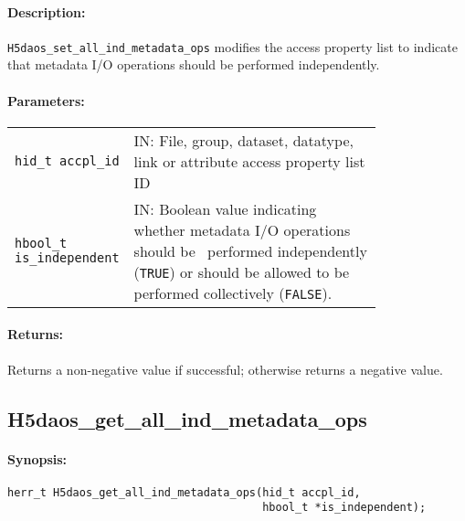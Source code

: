 \documentclass[../users_guide.tex]{subfiles}
\begin{document}
\paragraph{Description:}
\begin{flushleft}%
\texttt{H5daos\_set\_all\_ind\_metadata\_ops} modifies the access property list to indicate
that metadata I/O operations should be performed independently.
\end{flushleft}%

\paragraph{Parameters:}
\begin{flushleft}%
 \begin{tabular}{lp{0.8\linewidth}}%
   \texttt{hid\_t accpl\_id} & IN: File, group, dataset, datatype, link or attribute access property list ID \\
   \texttt{hbool\_t is\_independent} & IN: Boolean value indicating whether metadata I/O operations should be \
   performed independently (\texttt{TRUE}) or should be allowed to be performed collectively (\texttt{FALSE}). \\
 \end{tabular}%
\end{flushleft}%

\paragraph{Returns:}
\begin{flushleft}%
Returns a non-negative value if successful; otherwise returns a negative value.
\end{flushleft}%

\newpage
\subsection{H5daos\_get\_all\_ind\_metadata\_ops}
\label{ref:h5daos_get_all_ind_metadata_ops}

\paragraph{Synopsis:}
\begin{flushleft}%
\begin{verbatim}
herr_t H5daos_get_all_ind_metadata_ops(hid_t accpl_id,
                                       hbool_t *is_independent);
\end{verbatim}
\end{flushleft}%
\end{document}
